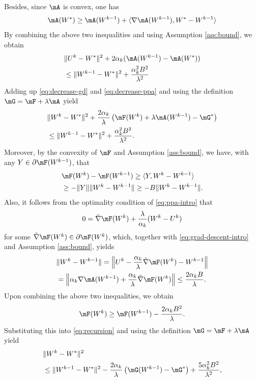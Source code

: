 Besides, since $\mA$ is convex, one has
$$ \mA(W^*) \geq \mA(W^{k-1}) + \langle \nabla \mA(W^{k-1}), W^* - W^{k-1}\rangle $$
By combining the above two inequalities and using Assumption \ref{ass:bound}, we obtain
\begin{equation}
    \label{eq:decrease-gd}
    \begin{aligned}
    & \|U^k - W^*\|^2 + 2\alpha_k(\mA(W^{k-1}) - \mA(W^*)) \\ & \leq \|W^{k-1} - W^*\|^2 + \frac{\alpha_k^2B^2}{\lambda^2}
    \end{aligned}
\end{equation}
Adding up \eqref{eq:decrease-gd} and \eqref{eq:decrease-ppa} and using the definition $\mG = \mF + \lambda\mA$ yield 
\begin{equation}
    \label{eq:recursion}
    \begin{aligned}
    & \|W^k - W^*\|^2 + \frac{2\alpha_k}{\lambda}\left(\mF(W^k) + \lambda\mA(W^{k-1}) - \mG^*\right) \\ & \leq \|W^{k-1} - W^*\|^2  + \frac{\alpha_k^2B^2}{\lambda^2}.
    \end{aligned}
\end{equation}
Moreover, by the convexity of $\mF$ and Assumption \ref{ass:bound}, we have, with any $Y\in\partial \mF(W^{k-1})$, that 
$$ 
\begin{aligned}
& \mF(W^k) - \mF(W^{k-1}) \geq \langle Y, W^k - W^{k-1}\rangle \\
& \geq -\|Y\|\|W^k - W^{k-1}\| \geq -B\|W^k - W^{k-1}\|.
\end{aligned}
$$
Also, it follows from the optimality condition of \eqref{eq:ppa-intro} that
$$ 0 = \tilde{\nabla} \mF(W^k) + \frac{\lambda}{\alpha_k}(W^k - U^k) $$
for some $\tilde{\nabla}\mF(W^k)\in\partial \mF(W^k)$, which, together with \eqref{eq:grad-descent-intro} and Assumption \ref{ass:bound}, yields 
$$ 
\begin{aligned}
& \|W^k - W^{k-1}\| = \left\| U^k - \frac{\alpha_k}{\lambda}\tilde{\nabla}\mF(W^k) - W^{k-1}\right\| \\
& = \left\|\alpha_k\nabla\mA(W^{k-1}) + \frac{\alpha_k}{\lambda}\tilde{\nabla}\mF(W^k)\right\| \leq \frac{2\alpha_kB}{\lambda}. 
\end{aligned}
$$
Upon combining the above two inequalities, we obtain
$$ \mF(W^k) \geq \mF(W^{k-1}) - \frac{2\alpha_kB^2}{\lambda}. $$
Substituting this into \eqref{eq:recursion} and using the definition $\mG = \mF + \lambda\mA$ yield
\begin{align*}
& \|W^k - W^*\|^2 \\
& \leq \|W^{k-1} - W^*\|^2 - \frac{2\alpha_k}{\lambda}\left(\mG(W^{k-1}) - \mG^*\right) + \frac{5\alpha_k^2B^2}{\lambda^2},
\end{align*}

